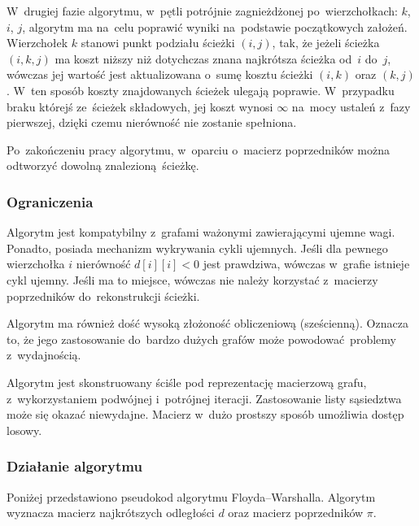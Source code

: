 \documentclass[11pt,a4paper,oneside]{report}
\begin{document}
W~drugiej fazie algorytmu, w~pętli potrójnie zagnieżdżonej po~wierzchołkach: $k$, $i$, $j$, algorytm ma na~celu poprawić wyniki na~podstawie początkowych założeń. Wierzchołek $k$ stanowi punkt podziału ścieżki $(i, j)$, tak, że jeżeli ścieżka $(i, k, j)$ ma koszt niższy niż dotychczas znana najkrótsza ścieżka od~$i$ do~$j$, wówczas jej wartość jest aktualizowana o~sumę kosztu ścieżki $(i, k)$ oraz $(k, j)$. W~ten sposób koszty znajdowanych ścieżek ulegają poprawie. W~przypadku braku którejś ze~ścieżek składowych, jej koszt wynosi $\infty$ na~mocy ustaleń z~fazy pierwszej, dzięki czemu nierówność nie zostanie spełniona.

Po~zakończeniu pracy algorytmu, w~oparciu o~macierz poprzedników można odtworzyć dowolną znalezioną ścieżkę.

\subsubsection{Ograniczenia}

Algorytm jest kompatybilny z~grafami ważonymi zawierającymi ujemne wagi. Ponadto, posiada mechanizm wykrywania cykli ujemnych. Jeśli dla pewnego wierzchołka $i$ nierówność $d[i][i] < 0$ jest prawdziwa, wówczas w~grafie istnieje cykl ujemny. Jeśli ma to miejsce, wówczas nie należy korzystać z~macierzy poprzedników do~rekonstrukcji ścieżki.

Algorytm ma również dość wysoką złożoność obliczeniową (sześcienną). Oznacza to, że jego zastosowanie do~bardzo dużych grafów może powodować problemy z~wydajnością.

Algorytm jest skonstruowany ściśle pod reprezentację macierzową grafu, z~wykorzystaniem podwójnej i~potrójnej iteracji. Zastosowanie listy sąsiedztwa może się okazać niewydajne. Macierz w~dużo prostszy sposób umożliwia dostęp losowy.

\newpage

\subsubsection{Działanie algorytmu}

Poniżej przedstawiono pseudokod algorytmu Floyda--Warshalla. Algorytm wyznacza macierz najkrótszych odległości $d$ oraz macierz poprzedników $\pi$.
\end{document}
